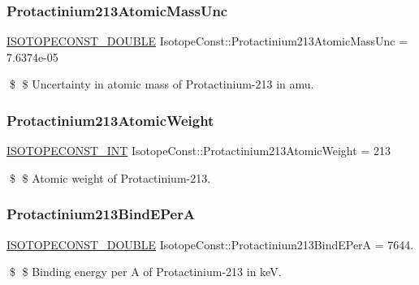 \subsubsection{\texorpdfstring{Protactinium213\+Atomic\+Mass\+Unc}{Protactinium213AtomicMassUnc}}
{\footnotesize\ttfamily \mbox{\hyperlink{group___isotope_const-_macros_ga8f45a7272ce02c0b4c65c44636ed719a}{I\+S\+O\+T\+O\+P\+E\+C\+O\+N\+S\+T\+\_\+\+D\+O\+U\+B\+LE}} Isotope\+Const\+::\+Protactinium213\+Atomic\+Mass\+Unc = 7.\+6374e-\/05}

\$ \$ Uncertainty in atomic mass of Protactinium-\/213 in amu. \mbox{\label{group___isotope_const-_protactinium-_pa213_gaf2e1ad0622ace9732e59dfe18f2bc97c}} 
\subsubsection{\texorpdfstring{Protactinium213\+Atomic\+Weight}{Protactinium213AtomicWeight}}
{\footnotesize\ttfamily \mbox{\hyperlink{group___isotope_const-_macros_ga5f18360b3e99483a35c32d789e62621c}{I\+S\+O\+T\+O\+P\+E\+C\+O\+N\+S\+T\+\_\+\+I\+NT}} Isotope\+Const\+::\+Protactinium213\+Atomic\+Weight = 213}

\$ \$ Atomic weight of Protactinium-\/213. \mbox{\label{group___isotope_const-_protactinium-_pa213_ga4af4a814a17fc9c483a5e10333149853}} 
\subsubsection{\texorpdfstring{Protactinium213\+Bind\+E\+PerA}{Protactinium213BindEPerA}}
{\footnotesize\ttfamily \mbox{\hyperlink{group___isotope_const-_macros_ga8f45a7272ce02c0b4c65c44636ed719a}{I\+S\+O\+T\+O\+P\+E\+C\+O\+N\+S\+T\+\_\+\+D\+O\+U\+B\+LE}} Isotope\+Const\+::\+Protactinium213\+Bind\+E\+PerA = 7644.}

\$ \$ Binding energy per A of Protactinium-\/213 in keV. \mbox{\label{group___isotope_const-_protactinium-_pa213_ga6e01ca5f4b192f2053307e94cd645923}} 
